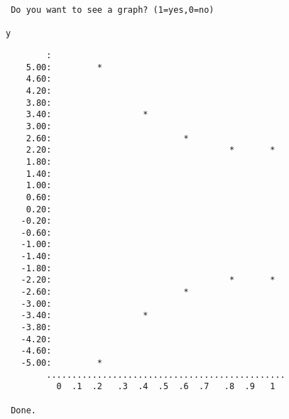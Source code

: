 {{\begin{verbatim}
 Do you want to see a graph? (1=yes,0=no)
                                                                              y
\end{verbatim}
{\samepage
\begin{verbatim}
        :
    5.00:         *
    4.60:
    4.20:
    3.80:
    3.40:                  *
    3.00:
    2.60:                          *
    2.20:                                   *       *
    1.80:
    1.40:
    1.00:
    0.60:
    0.20:
   -0.20:
   -0.60:
   -1.00:
   -1.40:
   -1.80:
   -2.20:                                   *       *
   -2.60:                          *
   -3.00:
   -3.40:                  *
   -3.80:
   -4.20:
   -4.60:
   -5.00:         *
        ...............................................
          0  .1  .2   .3  .4  .5  .6  .7   .8  .9   1

 Done.
\end{verbatim}}}}


